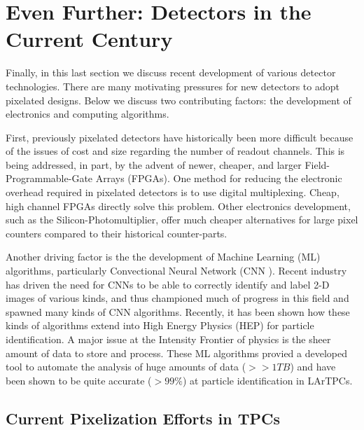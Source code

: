 

\section{Even Further: Detectors in the Current Century}

Finally, in this last section we discuss recent development of various detector technologies.
There are many motivating pressures for new detectors to adopt pixelated designs. 
Below we discuss two contributing factors: the development of electronics and computing algorithms.

First, previously pixelated detectors have historically been more difficult because of the issues of cost and size regarding the number of readout channels.
This is being addressed, in part, by the advent of newer, cheaper, and larger Field-Programmable-Gate Arrays (FPGAs).
One method for reducing the electronic overhead required in pixelated detectors is to use digital multiplexing.
Cheap, high channel FPGAs directly solve this problem. 
Other electronics development, such as the Silicon-Photomultiplier, offer much cheaper alternatives for large pixel counters compared to their historical counter-parts. 

\citep{Sadowski_2017}
Another driving factor is the the development of Machine Learning (ML) algorithms, particularly Convectional Neural Network (CNN \citep{Sadowski2017DeepLI}).
Recent industry has driven the need for CNNs to be able to correctly identify and label 2-D images of various kinds, and thus championed much of progress in this field and spawned many kinds of CNN algorithms. 
Recently, it has been shown how these kinds of algorithms extend into High Energy Physics (HEP) for particle identification.
A major issue at the Intensity Frontier of physics is the sheer amount of data to store and process. 
These ML algorithms provied a developed tool to automate the analysis of huge amounts of data ($>> 1 TB$) and have been shown to be quite accurate ($>99\%$) at particle identification in LArTPCs.

\subsection{Current Pixelization Efforts in TPCs}

